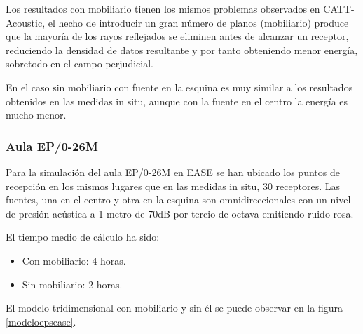 Los resultados con mobiliario tienen los mismos problemas observados en CATT-Acoustic, el hecho de introducir un gran número de planos (mobiliario) produce que la mayoría de los rayos reflejados se eliminen antes de alcanzar un receptor, reduciendo la densidad de datos resultante y por tanto obteniendo menor energía, sobretodo en el campo perjudicial.

En el caso sin mobiliario con fuente en la esquina es muy similar a los resultados obtenidos en las medidas in situ, aunque con la fuente en el centro la energía es mucho menor.

\subsubsection{Aula EP/0-26M}

Para la simulación del aula EP/0-26M en EASE se han ubicado los puntos de recepción en los mismos lugares que en las medidas in situ, 30 receptores. Las fuentes, una en el centro y otra en la esquina son omnidireccionales con un nivel de presión acústica a 1 metro de 70dB por tercio de octava emitiendo ruido rosa.

El tiempo medio de cálculo ha sido:
\begin{itemize}
\itemsep0em
  \item Con mobiliario: 4 horas.
  \item Sin mobiliario: 2 horas.
\end{itemize}



El modelo tridimensional con mobiliario y sin él se puede observar en la figura \ref{modeloepsease}.

